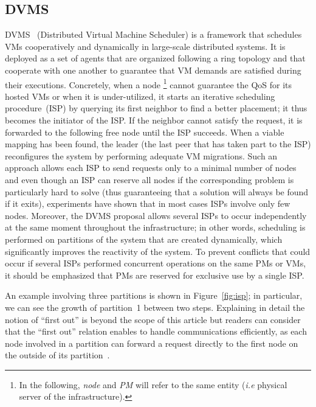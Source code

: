 \subsection{DVMS}\label{ssec:dvms}

DVMS~\cite{quesnel:ispa2013,quesnel:cpe2012} (Distributed Virtual Machine Scheduler) is a
framework that schedules VMs cooperatively and dynamically in large-scale distributed
systems. It is deployed as a set of agents that are organized following a ring topology
and that cooperate with one another to guarantee that VM demands are satisfied during
their executions. Concretely, when a node \footnote{In the following, 
\emph{node} and \emph{PM} will refer to the same entity (\emph{i.e} physical 
server of the infrastructure).} cannot guarantee the QoS for its hosted VMs or
when it is under-utilized, it starts an iterative scheduling procedure~(ISP) by querying
its first neighbor to find a better placement; it thus becomes the initiator of the ISP.
If the neighbor cannot satisfy the request, it is forwarded to the following free
node until the ISP succeeds. When a viable mapping has been found, the leader (\ie the last
peer that has taken part to the ISP) reconfigures the system by performing adequate VM
migrations. Such an approach allows each ISP to send requests only to a minimal number of
nodes and even though an ISP can reserve all nodes if the corresponding problem is
particularly hard to solve (thus guaranteeing that a solution will always be found if it
exits), experiments have shown that in most cases ISPs involve only few
nodes. Moreover, the DVMS proposal allows several ISPs to occur independently at the same
moment throughout the infrastructure; in other words, scheduling is performed on
partitions of the system that are created dynamically, which significantly improves the
reactivity of the system. To prevent conflicts that could occur if several ISPs performed
concurrent operations on the same PMs or VMs, it should be emphasized that PMs are reserved for
exclusive use by a single ISP.

An example involving three partitions is shown in Figure~\ref{fig:isp}; in particular, we
can see the growth of partition~1 between two steps. Explaining in detail the notion of
``first out'' is beyond the scope of this article but readers can consider that the
``first out'' relation enables to handle communications efficiently, as each node involved
in a partition can forward a request directly to the first node on the outside of its
partition~\cite{quesnel:cpe2012}.

